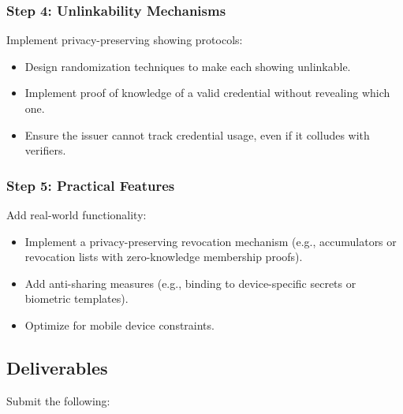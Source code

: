 \documentclass[10pt,a4paper,american]{exam}
\begin{document}
\subsubsection*{Step 4: Unlinkability Mechanisms}
Implement privacy-preserving showing protocols:
\begin{itemize}
	\item Design randomization techniques to make each showing unlinkable.
	\item Implement proof of knowledge of a valid credential without revealing which one.
	\item Ensure the issuer cannot track credential usage, even if it colludes with verifiers.
\end{itemize}

\subsubsection*{Step 5: Practical Features}
Add real-world functionality:
\begin{itemize}
	\item Implement a privacy-preserving revocation mechanism (e.g., accumulators or revocation lists with zero-knowledge membership proofs).
	\item Add anti-sharing measures (e.g., binding to device-specific secrets or biometric templates).
	\item Optimize for mobile device constraints.
\end{itemize}

\subsection*{Deliverables}
Submit the following:
\end{document}
